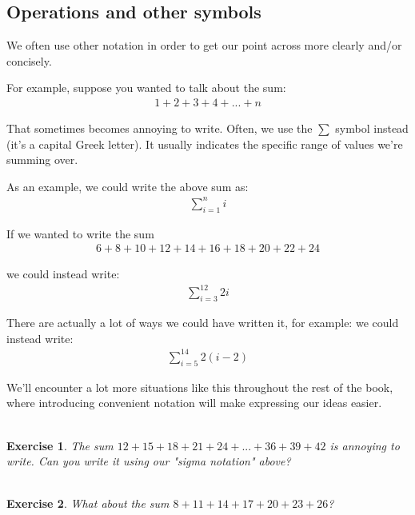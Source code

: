 \documentclass{book}
\newtheorem{exercise}{\\ \bf Exercise}
\begin{document}
\subsection{Operations and other symbols}

We often use other notation in order to get our point across more clearly and/or concisely. 

For example, suppose you wanted to talk about the sum:
\begin{align*}
1 + 2 + 3 + 4 + ... + n
\end{align*}

That sometimes becomes annoying to write. Often, we use the $\sum$ symbol instead (it's a capital Greek letter). It usually indicates the specific range of values we're summing over. %

As an example, we could write the above sum as:
\begin{align*}
\sum_{i=1}^n i
\end{align*}

If we wanted to write the sum
\begin{align*}
6 + 8 + 10 + 12 + 14 + 16 + 18 + 20 + 22 + 24
\end{align*}

we could instead write:
\begin{align*}
\sum_{i=3}^{12} 2i
\end{align*}

There are actually a lot of ways we could have written it, for example:
we could instead write:
\begin{align*}
\sum_{i=5}^{14} 2(i-2)
\end{align*}


We'll encounter a lot more situations like this throughout the rest of the book, where introducing convenient notation will make expressing our ideas easier.

\begin{exercise}
\label{sigma-notation-prac-1}
The sum $12 + 15 + 18 + 21 + 24 + ... + 36 + 39 + 42$ is annoying to write. Can you write it using our "sigma notation" above?
\end{exercise}

\begin{exercise}
\label{sigma-notation-prac-2}
What about the sum $8 + 11 + 14 + 17 + 20 + 23 + 26$?
\end{exercise}


\end{document}
